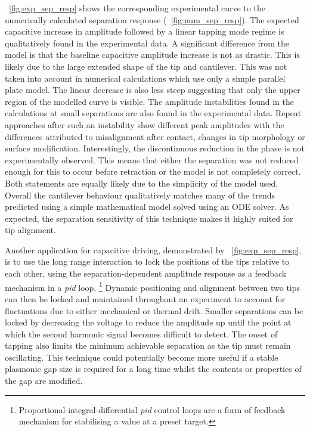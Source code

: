 \documentclass{article}
\begin{document}
\figurename~\ref{fig:exp_sep_resp} shows the corresponding experimental curve to the numerically calculated separation response (\figurename~\ref{fig:num_sep_resp}). The expected capacitive increase in amplitude followed by a linear tapping mode regime is qualitatively found in the experimental data. A significant difference from the model is that the baseline capacitive amplitude increase is not as drastic. This is likely due to the large extended shape of the tip and cantilever. This was not taken into account in numerical calculations which use only a simple parallel plate model. The linear decrease is also less steep suggesting that only the upper region of the modelled curve is visible. The amplitude instabilities found in the calculations at small separations are also found in the experimental data. Repeat approaches after such an instability show different peak amplitudes with the differences attributed to misalignment after contact, changes in tip morphology or surface modification. Interestingly, the discontinuous reduction in the phase is not experimentally observed. This means that either the separation was not reduced enough for this to occur before retraction or the model is not completely correct. Both statements are equally likely due to the simplicity of the model used. Overall the cantilever behaviour qualitatively matches many of the trends predicted using a simple mathematical model solved using an ODE solver. As expected, the separation sensitivity of this technique makes it highly suited for tip alignment.

Another application for capacitive driving, demonstrated by \figurename~\ref{fig:exp_sep_resp}, is to use the long range interaction to lock the positions of the tips relative to each other, using the separation-dependent amplitude response as a feedback mechanism in a \emph{pid} loop.%
\footnote{Proportional-integral-differential \emph{pid} control loops are a form of feedback mechanism for stabilising a value at a preset target.}
Dynamic positioning and alignment between two tips can then be locked and maintained throughout an experiment to account for fluctuations due to either mechanical or thermal drift. Smaller separations can be locked by decreasing the voltage to reduce the amplitude up until the point at which the second harmonic signal becomes difficult to detect. The onset of tapping also limits the minimum achievable separation as the tip must remain oscillating. This technique could potentially become more useful if a stable plasmonic gap size is required for a long time whilst the contents or properties of the gap are modified.
\end{document}

